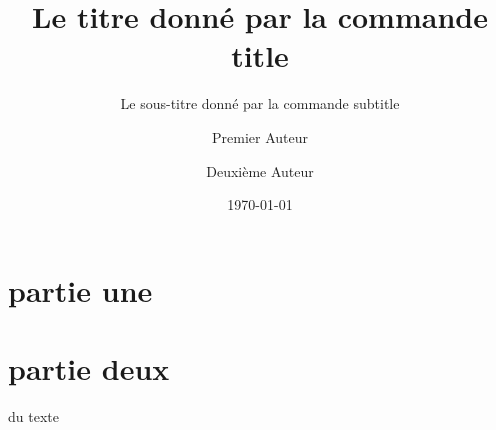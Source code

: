 \documentclass[%
]{article}
\title{Le titre donné par la commande title}
\subtitle{Le sous-titre donné par la commande subtitle}
\author{Premier Auteur \and Deuxième Auteur}
\date{\today}
\begin{document}
\maketitle

\part[première]{partie une}
\blinddocument

\part{partie deux}
\blinddocument

\appendix
du texte

\blinddocument
\end{document}
